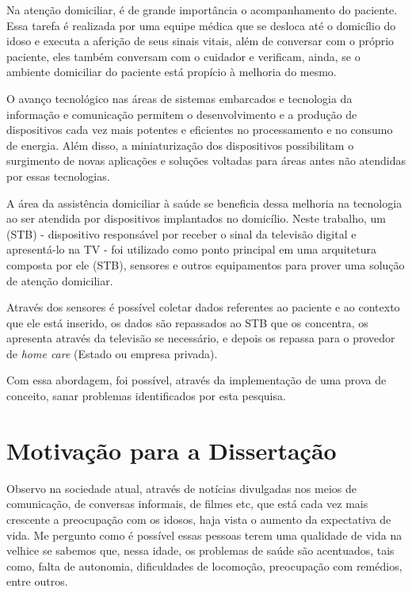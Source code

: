 Na atenção domiciliar, é de grande importância o acompanhamento do paciente.
Essa tarefa é realizada por uma equipe médica que se desloca até o domicílio do
idoso e executa a aferição de seus sinais vitais, além de conversar com o
próprio paciente, eles também conversam com o cuidador e verificam, ainda, se o
ambiente domiciliar do paciente está propício à melhoria do mesmo.

O avanço tecnológico nas áreas de sistemas embarcados e tecnologia da informação
e comunicação permitem o desenvolvimento e a produção de dispositivos cada vez
mais potentes e eficientes no processamento e no consumo de energia. Além disso,
a miniaturização dos dispositivos possibilitam o surgimento de novas aplicações
e soluções voltadas para áreas antes não atendidas por essas tecnologias.


A área da assistência domiciliar à saúde se beneficia dessa melhoria na 
tecnologia ao ser atendida por dispositivos implantados no domicílio. Neste 
trabalho, um \stb[] (STB) - dispositivo responsável por receber o sinal da 
televisão digital e apresentá-lo na TV - foi utilizado como ponto principal em
uma arquitetura composta por ele (STB), sensores e outros equipamentos para 
prover uma solução de atenção domiciliar.

Através dos sensores é possível coletar dados referentes ao paciente e ao 
contexto que ele está inserido, os dados são repassados ao STB que os concentra,
os apresenta através da televisão se necessário, e depois os repassa para o
provedor de \textit{home care} (Estado ou empresa privada).

Com essa abordagem, foi possível, através da implementação de uma  prova de
conceito, sanar problemas identificados por esta pesquisa.

\section{Motivação para a Dissertação}\label{sec:motivacao}

Observo na sociedade atual, através de notícias divulgadas nos meios
de comunicação, de conversas informais, de filmes etc, que está cada
vez mais crescente a preocupação com os idosos, haja vista o
aumento da expectativa de vida. Me pergunto como é possível essas pessoas
terem uma qualidade de vida na velhice se sabemos que, nessa idade,
os problemas de saúde são acentuados, tais como, falta de autonomia,
dificuldades de locomoção, preocupação com remédios, entre outros.

